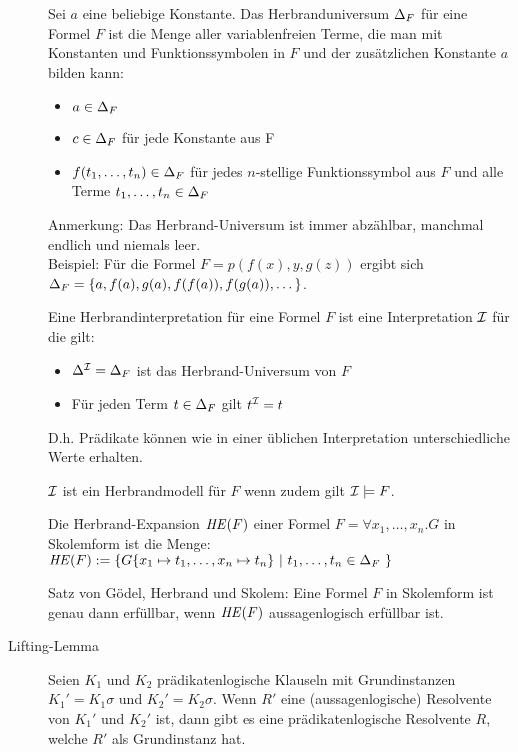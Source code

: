 \begin{description}
            Sei $a$ eine beliebige Konstante. Das Herbranduniversum $\Delta_{F}$ für eine Formel $F$ ist die Menge aller variablenfreien Terme, die man mit Konstanten und Funktionssymbolen in $F$ und der zusätzlichen Konstante $a$ bilden kann:
            \begin{itemize}
                \item $a \in \Delta_{F}$
                \item $c \in \Delta_{F}$ für jede Konstante aus F
                \item $f(t_{1}, \dots, t_{n}) \in \Delta_{F}$ für jedes $n$-stellige Funktionssymbol aus $F$ und alle Terme $t_{1}, \dots, t_{n} \in \Delta_{F}$
            \end{itemize}
            Anmerkung: Das Herbrand-Universum ist immer abzählbar, manchmal endlich und niemals leer. \\
            Beispiel: Für die Formel $F = p(f(x), y, g(z))$ ergibt sich $\Delta_{F} = \{a, f(a), g(a), f(f(a)), f(g(a)), \dots \}$.

\newpage
            Eine Herbrandinterpretation für eine Formel $F$ ist eine Interpretation $\mathcal{I}$ für die gilt:
            \begin{itemize}
                \item $\Delta^{\mathcal{I}} = \Delta_{F}$ ist das Herbrand-Universum von $F$
                \item Für jeden Term $t \in \Delta_{F}$ gilt $t^{\mathcal{I}} = t$
            \end{itemize}
            D.h. Prädikate können wie in einer üblichen Interpretation unterschiedliche Werte erhalten.

            $\mathcal{I}$ ist ein Herbrandmodell für $F$ wenn zudem gilt $\mathcal{I} \models F$.

            Die \f{Herbrand-Expansion} $\mathit{HE}(F)$ einer Formel $F = \forall x_{1}, \dots, x_{n}.G$ in Skolemform ist die Menge:
                $\HE(F) := \{ G\{x_{1} \mapsto t_{1}, \dots, x_{n} \mapsto t_{n} \}\ |\ t_{1},\dots,t_{n} \in \Delta_{F}\ \}$

            Satz von Gödel, Herbrand und Skolem: Eine Formel $F$ in Skolemform ist genau dann erfüllbar, wenn $\mathit{HE}(F)$ aussagenlogisch erfüllbar ist.

        \item[Lifting-Lemma] Seien $K_{1}$ und $K_{2}$ prädikatenlogische Klauseln mit Grundinstanzen $K_{1}' = K_{1} \sigma$ und $K_{2}' = K_{2} \sigma$. Wenn $R'$ eine (aussagenlogische) Resolvente von $K_{1}'$ und $K_{2}'$ ist, dann gibt es eine prädikatenlogische Resolvente $R$, welche $R'$ als Grundinstanz hat. 


\end{description}
